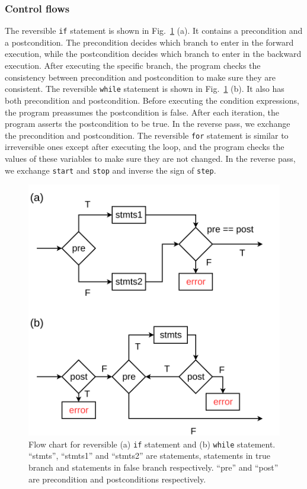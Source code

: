 \documentclass[aps,twocolumn,longbibliography,english,superscriptaddress]{revtex4-1}
\newcommand{\<}{\langle}
\renewcommand{\>}{\rangle}
\newcommand{\Fig}[1]{Fig.~\ref{#1}}
\theoremstyle{definition}\newtheorem{definition}{\textit{Definition}}
\begin{document}
\subsubsection{Control flows}
The reversible \texttt{if} statement is shown in \Fig{fig:controlflow} (a). It contains a precondition and a postcondition. The precondition decides which branch to enter in the forward execution, while the postcondition decides which branch to enter in the backward execution. After executing the specific branch, the program checks the consistency between precondition and postcondition to make sure they are consistent.
The reversible \texttt{while} statement is shown in \Fig{fig:controlflow} (b). It also has both precondition and postcondition. Before executing the condition expressions, the program preassumes the postcondition is false.
After each iteration, the program asserts the postcondition to be true. In the reverse pass, we exchange the precondition and postcondition.
The reversible \texttt{for} statement is similar to irreversible ones except after executing the loop, and the program checks the values of these variables to make sure they are not changed. In the reverse pass, we exchange \texttt{start} and \texttt{stop} and inverse the sign of \texttt{step}.
\begin{figure}
    \centerline{\includegraphics[width=0.8\columnwidth,trim={0 0cm 0 0cm},clip]{images/controlflow.pdf}}
    \caption{Flow chart for reversible (a) \texttt{if} statement and (b) \texttt{while} statement. ``stmts'', ``stmts1'' and ``stmts2'' are statements, statements in true branch and statements in false branch respectively. ``pre'' and ``post'' are precondition and postconditions respectively.}\label{fig:controlflow}
\end{figure}
\end{document}
